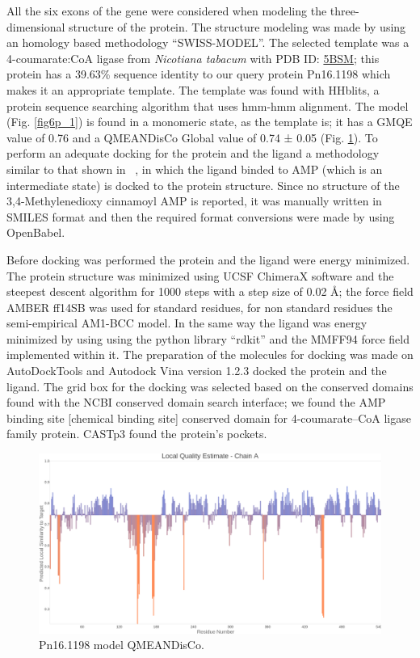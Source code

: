 \documentclass[12pt]{article}
\newcommand{\textcite}[1]{\citeauthor{#1}~\citeyear{#1}}
\begin{document}
	All the six exons of the gene were considered when modeling the three-dimensional structure of the protein. The structure modeling was made by using an homology based methodology ``SWISS-MODEL''. \cite{swiss} The selected template was a 4-coumarate:CoA ligase from \textit{Nicotiana tabacum} with PDB ID: \href{https://www.rcsb.org/structure/5BSM}{5BSM}; this protein has a 39.63\% sequence identity to our query protein Pn16.1198 which makes it an appropriate template. The template was found with HHblits, a protein sequence searching algorithm that uses hmm-hmm alignment. \cite{hhblits} The model (Fig. \ref{fig6p_1}) is found in a monomeric state, as the template is; it has a GMQE value of 0.76 and a QMEANDisCo Global value of 0.74 ± 0.05 (Fig. \ref{fig6p_2}). \cite{qmeandisco_swiss} To perform an adequate docking for the protein and the ligand a methodology similar to that shown in \textcite{coaligase}, in which the ligand binded to AMP (which is an intermediate state) is docked to the protein structure. Since no structure of the 3,4-Methylenedioxy cinnamoyl AMP is reported, it was manually written in SMILES format and then the required format conversions were made by using OpenBabel. \cite{obabel}
	
	Before docking was performed the protein and the ligand were energy minimized. The protein structure was minimized using UCSF ChimeraX software \cite{chimera,chimera_2} and the steepest descent algorithm for 1000 steps with a step size of 0.02 \r{A}; the force field AMBER ff14SB was used for standard residues, for non standard residues the semi-empirical AM1-BCC model. \cite{am1_bcc,am1_bcc_2,am1_bcc_3} In the same way the ligand was energy minimized by using using the python library ``rdkit'' and the MMFF94 force field implemented within it. \cite{rdkit,rdkit_mmff}	The preparation of the molecules for docking was made on AutoDockTools and Autodock Vina version 1.2.3 docked the protein and the ligand. \cite{adt,vina,vina_2} The grid box for the docking was selected based on the conserved domains found with the NCBI conserved domain search interface; we found the AMP binding site [chemical binding site] conserved domain for 4-coumarate--CoA ligase family protein. \cite{cdd,cdd_2}  CASTp3 found the protein's pockets. \cite{castp}
	
	\FloatBarrier
	\begin{figure}
		\centering
		\includegraphics[width=\textwidth-50pt]{../6/propose/Swiss/Local_quality_estimate.png}
		\caption{\centering Pn16.1198 model QMEANDisCo.}
		\label{fig6p_2}
	\end{figure}
	\FloatBarrier
	
\end{document}
